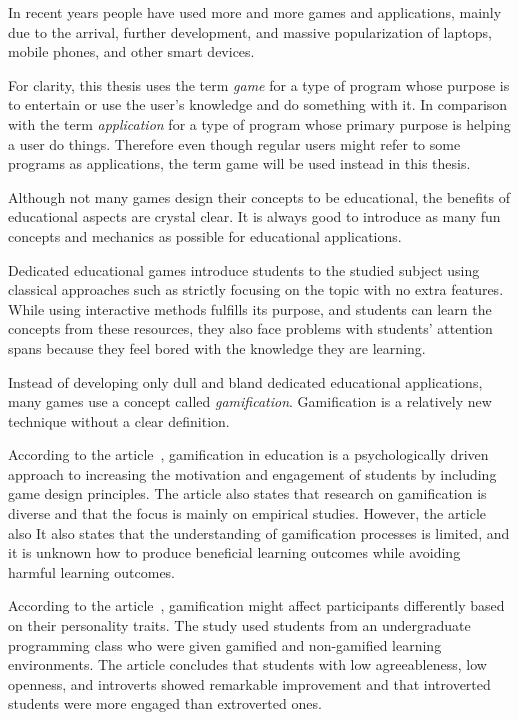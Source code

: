 In recent years people have used more and more games and applications, mainly due to the arrival, further development, and massive popularization of laptops, mobile phones, and other smart devices.

For clarity, this thesis uses the term \emph{game} for a type of program whose purpose is to entertain or use the user's knowledge and do something with it. In comparison with the term \emph{application} for a type of program whose primary purpose is helping a user do things. Therefore even though regular users might refer to some programs as applications, the term game will be used instead in this thesis.

Although not many games design their concepts to be educational, the benefits of educational aspects are crystal clear.
It is always good to introduce as many fun concepts and mechanics as possible for educational applications.

Dedicated educational games introduce students to the studied subject using classical approaches such as strictly focusing on the topic with no extra features.
While using interactive methods fulfills its purpose, and students can learn the concepts from these resources, they also face problems with students' attention spans because they feel bored with the knowledge they are learning.

Instead of developing only dull and bland dedicated educational applications, many games use a concept called \emph{gamification}.
Gamification is a relatively new technique without a clear definition.

According to the article~\cite{dichev_2017_gamifying}, gamification in education is a psychologically driven approach to increasing the motivation and engagement of students by including game design principles.
The article also states that research on gamification is diverse and that the focus is mainly on empirical studies. However, the article also 
It also states that the understanding of gamification processes is limited, and it is unknown how to produce beneficial learning outcomes while avoiding harmful learning outcomes. 

According to the article~\cite{smiderle_2020_the}, gamification might affect participants differently based on their personality traits.
The study used students from an undergraduate programming class who were given gamified and non-gamified learning environments.
The article concludes that students with low agreeableness, low openness, and introverts showed remarkable improvement and that introverted students were more engaged than extroverted ones.

